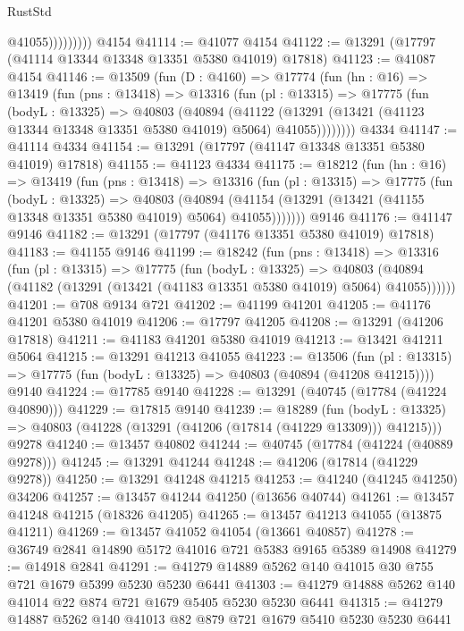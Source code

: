 \begin{lexlean}{RustStd}
\begin{coremodule}
                      @41055)))))))))
    @4154
@41114 := @41077 @4154
@41122 := @13291 (@17797 (@41114 @13344 @13348 @13351 @5380 @41019) @17818)
@41123 := @41087 @4154
@41146 := @13509
    (fun (D : @4160) =>
    @17774
      (fun (hn : @16) =>
      @13419
        (fun (pns : @13418) =>
        @13316
          (fun (pl : @13315) =>
          @17775
            (fun (bodyL : @13325) =>
            @40803
              (@40894
                (@41122
                  (@13291 (@13421 (@41123 @13344 @13348 @13351 @5380 @41019) @5064) @41055))))))))
    @4334
@41147 := @41114 @4334
@41154 := @13291 (@17797 (@41147 @13348 @13351 @5380 @41019) @17818)
@41155 := @41123 @4334
@41175 := @18212
    (fun (hn : @16) =>
    @13419
      (fun (pns : @13418) =>
      @13316
        (fun (pl : @13315) =>
        @17775
          (fun (bodyL : @13325) =>
          @40803
            (@40894 (@41154 (@13291 (@13421 (@41155 @13348 @13351 @5380 @41019) @5064) @41055)))))))
    @9146
@41176 := @41147 @9146
@41182 := @13291 (@17797 (@41176 @13351 @5380 @41019) @17818)
@41183 := @41155 @9146
@41199 := @18242
    (fun (pns : @13418) =>
    @13316
      (fun (pl : @13315) =>
      @17775
        (fun (bodyL : @13325) =>
        @40803 (@40894 (@41182 (@13291 (@13421 (@41183 @13351 @5380 @41019) @5064) @41055))))))
@41201 := @708 @9134 @721
@41202 := @41199 @41201
@41205 := @41176 @41201 @5380 @41019
@41206 := @17797 @41205
@41208 := @13291 (@41206 @17818)
@41211 := @41183 @41201 @5380 @41019
@41213 := @13421 @41211 @5064
@41215 := @13291 @41213 @41055
@41223 := @13506
    (fun (pl : @13315) => @17775 (fun (bodyL : @13325) => @40803 (@40894 (@41208 @41215))))
    @9140
@41224 := @17785 @9140
@41228 := @13291 (@40745 (@17784 (@41224 @40890)))
@41229 := @17815 @9140
@41239 := @18289
    (fun (bodyL : @13325) => @40803 (@41228 (@13291 (@41206 (@17814 (@41229 @13309))) @41215)))
    @9278
@41240 := @13457 @40802
@41244 := @40745 (@17784 (@41224 (@40889 @9278)))
@41245 := @13291 @41244
@41248 := @41206 (@17814 (@41229 @9278))
@41250 := @13291 @41248 @41215
@41253 := @41240 (@41245 @41250) @34206
@41257 := @13457 @41244 @41250 (@13656 @40744)
@41261 := @13457 @41248 @41215 (@18326 @41205)
@41265 := @13457 @41213 @41055 (@13875 @41211)
@41269 := @13457 @41052 @41054 (@13661 @40857)
@41278 := @36749 @2841 @14890 @5172 @41016 @721 @5383 @9165 @5389 @14908
@41279 := @14918 @2841
@41291 := @41279 @14889 @5262 @140 @41015 @30 @755 @721 @1679 @5399 @5230 @5230 @6441
@41303 := @41279 @14888 @5262 @140 @41014 @22 @874 @721 @1679 @5405 @5230 @5230 @6441
@41315 := @41279 @14887 @5262 @140 @41013 @82 @879 @721 @1679 @5410 @5230 @5230 @6441

\end{coremodule}
\end{lexlean}
